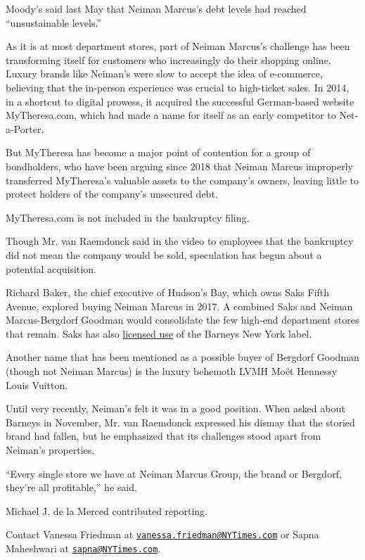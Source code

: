 Moody's said last May that Neiman Marcus's debt levels had reached
``unsustainable levels.''

As it is at most department stores, part of Neiman Marcus's challenge
has been transforming itself for customers who increasingly do their
shopping online. Luxury brands like Neiman's were slow to accept the
idea of e-commerce, believing that the in-person experience was crucial
to high-ticket sales. In 2014, in a shortcut to digital prowess, it
acquired the successful German-based website MyTheresa.com, which had
made a name for itself as an early competitor to Net-a-Porter.

But MyTheresa has become a major point of contention for a group of
bondholders, who have been arguing since 2018 that Neiman Marcus
improperly transferred MyTheresa's valuable assets to the company's
owners, leaving little to protect holders of the company's unsecured
debt.

MyTheresa.com is not included in the bankruptcy filing.

Though Mr. van Raemdonck said in the video to employees that the
bankruptcy did not mean the company would be sold, speculation has begun
about a potential acquisition.

Richard Baker, the chief executive of Hudson's Bay, which owns Saks
Fifth Avenue, explored buying Neiman Marcus in 2017. A combined Saks and
Neiman Marcus-Bergdorf Goodman would consolidate the few high-end
department stores that remain. Saks has also
\href{https://www.nytimes3xbfgragh.onion/2019/11/09/sunday-review/barneys-saks.html}{licensed
use} of the Barneys New York label.

Another name that has been mentioned as a possible buyer of Bergdorf
Goodman (though not Neiman Marcus) is the luxury behemoth LVMH Moët
Hennessy Louis Vuitton.

Until very recently, Neiman's felt it was in a good position. When asked
about Barneys in November, Mr. van Raemdonck expressed his dismay that
the storied brand had fallen, but he emphasized that its challenges
stood apart from Neiman's properties.

``Every single store we have at Neiman Marcus Group, the brand or
Bergdorf, they're all profitable,'' he said.

Michael J. de la Merced contributed reporting.

Contact Vanessa Friedman at
\href{mailto:vanessa.friedman@NYTimes.com}{\nolinkurl{vanessa.friedman@NYTimes.com}}
or Sapna Maheshwari at
\href{mailto:sapna@NYTimes.com}{\nolinkurl{sapna@NYTimes.com}}.

